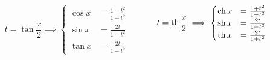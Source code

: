 \begin{frame}
\begin{columns}
\begin{column}{2cm}
  
\end{column}



\begin{column}{6cm}
$$
t=\tan \frac{x}{2} \implies
\begin{cases}
    \cos x &= \frac {1-t^2}{1+t^2} \\
    \sin x &= \frac{2t}{1+t^2} \\
    \tan x &= \frac{2t}{1-t^2}
\end{cases}
$$
\end{column}

\pause

\begin{column}{6cm}
$$ 
t=\mathop{\text{th}}\nolimits \frac{x}{2} \implies
\begin{cases}
    \mathop{\text{ch}}\nolimits x &= \frac {1+t^2}{1-t^2} \\
    \mathop{\text{sh}}\nolimits x &= \frac{2t}{1-t^2} \\
    \mathop{\text{th}}\nolimits x &= \frac{2t}{1+t^2}
\end{cases}
$$ 
\end{column}
\end{columns}
\end{frame}



